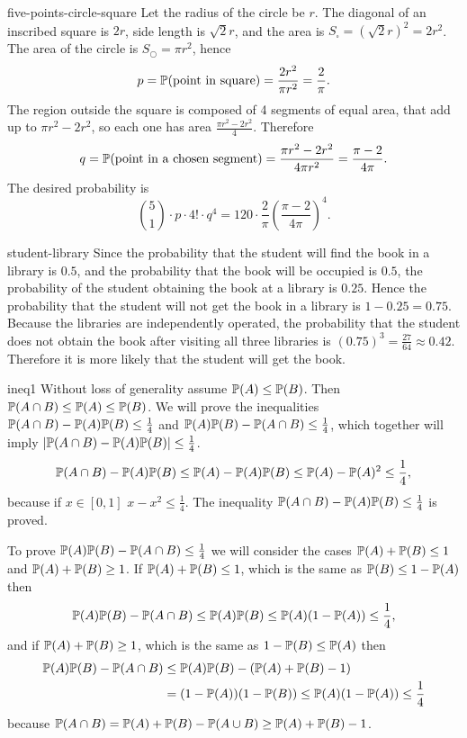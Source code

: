 \begin{sol}{five-points-circle-square}
    Let the radius of the circle be $r$. The diagonal of an inscribed square is $2r$, side length is $\sqrt{2}r$, and the area is $S_\square=(\sqrt{2}r)^2=2r^2$. The area of the circle is $S_\bigcirc=\pi r^2$, hence
    \[
        p=\mathbb{P}(\text{point in square})=\frac{2r^2}{\pi r^2}=\frac{2}{\pi}.
    \]
    The region outside the square is composed of 4 segments of equal area, that add up to $\pi r^2-2r^2$, so each one has area $\frac{\pi r^2-2r^2}{4}$. Therefore
    \[
        q=\mathbb{P}(\text{point in a chosen segment})=\frac{\pi r^2-2r^2}{4\pi r^2}=\frac{\pi-2}{4\pi}.
    \]
    The desired probability is
    \[
        \binom{5}{1}\cdot p\cdot 4!\cdot q^4 = 120\cdot\frac{2}{\pi}\left(\frac{\pi-2}{4\pi}\right)^4.
    \]
\end{sol}

\begin{sol}{student-library}
    Since the probability that the student will find the book in a library is $0.5$, and the probability that the book will be occupied is $0.5$, the probability of the student obtaining the book at a library is $0.25$. Hence the probability that the student will not get the book in a library is $1-0.25=0.75$. Because the libraries are independently operated, the probability that the student does not obtain the book after visiting all three libraries is $(0.75)^3=\frac{27}{64}\approx0.42$. Therefore it is more likely that the student will get the book.
\end{sol}

\begin{sol}{ineq1}
    Without loss of generality assume $\mathbb{P}(A)\le\mathbb{P}(B)$. Then $\mathbb{P}(A\cap B)\le\mathbb{P}(A)\le\mathbb{P}(B)$. We will prove the inequalities $\mathbb{P}(A\cap B)-\mathbb{P}(A)\mathbb{P}(B)\le\frac14$ and $\mathbb{P}(A)\mathbb{P}(B)-\mathbb{P}(A\cap B)\le\frac14$, which together will imply $\left|\mathbb{P}(A\cap B)-\mathbb{P}(A)\mathbb{P}(B)\right|\le\frac14$.
    \[
        \mathbb{P}(A\cap B)-\mathbb{P}(A)\mathbb{P}(B)\le\mathbb{P}(A)-\mathbb{P}(A)\mathbb{P}(B)\le\mathbb{P}(A)-\mathbb{P}(A)^2\le\frac14,
    \]
    because if $x\in[0,1]$ $x-x^2\le\frac14$. The inequality $\mathbb{P}(A\cap B)-\mathbb{P}(A)\mathbb{P}(B)\le\frac14$ is proved.
    
    To prove $\mathbb{P}(A)\mathbb{P}(B)-\mathbb{P}(A\cap B)\le\frac14$ we will consider the cases $\mathbb{P}(A)+\mathbb{P}(B)\le1$ and $\mathbb{P}(A)+\mathbb{P}(B)\ge1$. If $\mathbb{P}(A)+\mathbb{P}(B)\le1$, which is the same as $\mathbb{P}(B)\le1-\mathbb{P}(A)$ then
    \[
        \mathbb{P}(A)\mathbb{P}(B)-\mathbb{P}(A\cap B)\le\mathbb{P}(A)\mathbb{P}(B)\le\mathbb{P}(A)(1-\mathbb{P}(A))\le\frac14,
    \]
    and if $\mathbb{P}(A)+\mathbb{P}(B)\ge1$, which is the same as $1-\mathbb{P}(B)\le\mathbb{P}(A)$ then
    \begin{align*}
        \mathbb{P}(A)\mathbb{P}(B)-\mathbb{P}(A\cap B)&\le\mathbb{P}(A)\mathbb{P}(B)-(\mathbb{P}(A)+\mathbb{P}(B)-1)\\
        &=(1-\mathbb{P}(A))(1-\mathbb{P}(B))\le\mathbb{P}(A)(1-\mathbb{P}(A))\le\frac14
    \end{align*}
    because $\mathbb{P}(A\cap B)=\mathbb{P}(A)+\mathbb{P}(B)-\mathbb{P}(A\cup B)\ge\mathbb{P}(A)+\mathbb{P}(B)-1$.
\end{sol}

